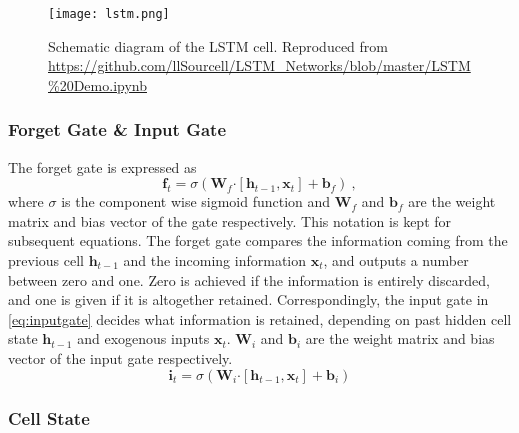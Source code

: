 \begin{figure}
	\noindent\texttt{[image: lstm.png]}
	\caption{Schematic diagram of the LSTM cell. Reproduced 
	from \url{https://github.com/llSourcell/LSTM_Networks/blob/master/LSTM\%20Demo.ipynb}}
	\label{fig:lstmcell}
\end{figure}

\subsubsection*{Forget Gate \& Input Gate}

The forget gate is expressed as 
%
\begin{equation}\label{eq:forgetgate}
 \mathbf{f}_{t} = \sigma  \left( \mathbf{W}_f \boldsymbol{\cdot}  \left[ \mathbf{h}_{t-1}, \mathbf{x}_t \right] + 
 \mathbf{b}_f \right) \ ,
\end{equation}
%
where $\sigma$ is the component wise sigmoid function and  $\mathbf{W}_{f}$ and $\mathbf{b}_{f}$ 
are the weight matrix and bias vector of the gate respectively. This notation is kept for 
subsequent equations. The forget gate compares the information coming from the previous cell 
$\mathbf{h}_{t-1}$ and the incoming information $\mathbf{x}_{t}$, and outputs a number between 
zero and one. Zero is achieved if the information is entirely discarded, and one is given if it 
is altogether retained.
%
Correspondingly, the input gate in \cref{eq:inputgate} decides what information is retained, depending 
on past hidden cell state $\mathbf{h}_{t-1}$ and exogenous inputs $\mathbf{x}_t$. $\mathbf{W}_{i} $ and  
$\mathbf{b}_{i}$ are the weight matrix and bias vector of the input gate respectively.
%
\begin{equation}\label{eq:inputgate}
 \mathbf{i}_{t} = \sigma  \left(\mathbf{W}_{i} \boldsymbol{\cdot} \left[ \mathbf{h}_{t-1}, \mathbf{x}_{t} \right] + 
 \mathbf{b}_{i} \right)
\end{equation}

\subsubsection*{Cell State}

